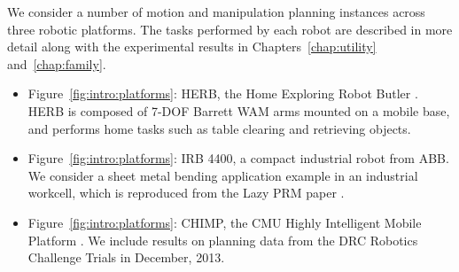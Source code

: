 We consider a number of motion and manipulation planning instances
across three robotic platforms.
The tasks performed by each robot are described in more detail
along with the experimental results
in Chapters~\ref{chap:utility} and~\ref{chap:family}.
\begin{itemize}
\item Figure~\ref{fig:intro:platforms}:
   HERB, the Home Exploring Robot Butler
   \citep{srinivasa2012herb20}.
   HERB is composed of 7-DOF Barrett WAM arms mounted on a mobile base,
   and performs home tasks such as table clearing and retrieving objects.
\item Figure~\ref{fig:intro:platforms}:
   IRB 4400, a compact industrial robot from ABB.
   We consider a sheet metal bending application example
   in an industrial workcell,
   which is reproduced from the Lazy PRM paper
   \citep{bohlin2000lazyprm}.
\item Figure~\ref{fig:intro:platforms}:
   CHIMP, the CMU Highly Intelligent Mobile Platform
   \citep{stentz2014chimp}.
   We include results on planning data from the DRC Robotics Challenge
   Trials in December, 2013.
\end{itemize}

